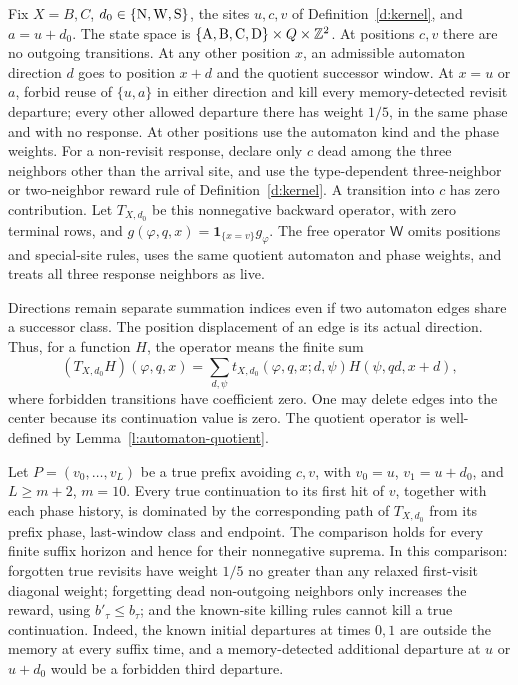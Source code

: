 \begin{definition}\label{d:stationary-walk}
Fix \(X=B,C\), \(d_0\in\{{\rm N},{\rm W},{\rm S}\}\),
the sites \(u,c,v\) of Definition~\ref{d:kernel}, and \(a=u+d_0\).
The state space is
\(\{{\rm A},{\rm B},{\rm C},{\rm D}\}\times Q\times\mathbb Z^2\).
At positions \(c,v\) there are no outgoing transitions.
At any other position \(x\), an admissible automaton direction \(d\)
goes to position \(x+d\) and the quotient successor window.
At \(x=u\) or \(a\), forbid reuse of \(\{u,a\}\) in either
direction and kill every memory-detected revisit departure;
every other allowed departure there has weight \(1/5\),
in the same phase and with no response.
At other positions use the automaton kind and the phase weights.
For a non-revisit response, declare only \(c\) dead among the three
neighbors other than the arrival site, and use the type-dependent
three-neighbor or two-neighbor reward rule of Definition~\ref{d:kernel}.
A transition into \(c\) has zero contribution.
Let \(T_{X,d_0}\) be this nonnegative backward operator, with zero
terminal rows, and \(g(\varphi,q,x)=\mathbf1_{\{x=v\}}g_\varphi\).
The free operator \(\mathsf W\) omits positions and special-site
rules, uses the same quotient automaton and phase weights, and
treats all three response neighbors as live.
\end{definition}

Directions remain separate summation indices even if two automaton
edges share a successor class. The position displacement of an edge
is its actual direction. Thus, for a function \(H\), the operator
means the finite sum
\[
 (T_{X,d_0}H)(\varphi,q,x)
   =\sum_{d,\psi}t_{X,d_0}(\varphi,q,x;d,\psi)
                         H(\psi,q d,x+d),
\]
where forbidden transitions have coefficient zero. One may delete
edges into the center because its continuation value is zero.
The quotient operator is well-defined by
Lemma~\ref{l:automaton-quotient}.

\begin{lemma}\label{l:stationary-domination}
Let \(P=(v_0,\ldots,v_L)\) be a true prefix avoiding \(c,v\),
with \(v_0=u\), \(v_1=u+d_0\), and \(L\ge m+2\), \(m=10\).
Every true continuation to its first hit of \(v\), together with
each phase history, is dominated by the corresponding path of
\(T_{X,d_0}\) from its prefix phase, last-window class and endpoint.
The comparison holds for every finite suffix horizon and hence
for their nonnegative suprema.
In this comparison:
forgotten true revisits have weight \(1/5\) no greater than any
relaxed first-visit diagonal weight; forgetting dead non-outgoing
neighbors only increases the reward, using \(b'_\tau\le b_\tau\);
and the known-site killing rules cannot kill a true continuation.
Indeed, the known initial departures at times \(0,1\) are outside
the memory at every suffix time, and a memory-detected additional
departure at \(u\) or \(u+d_0\) would be a forbidden third departure.
\end{lemma}


